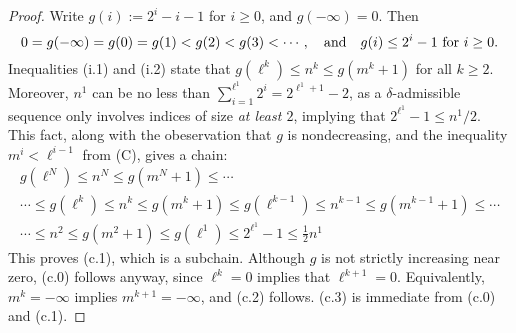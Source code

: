 \documentclass[10pt]{article}
\newcommand{\minDim}{m}
\begin{document}
\begin{KoszulSequenceCombinatorics}
\begin{proof}
Write $g(i):=2^i-i-1$ for $i\geq0$, and $g(-\infty)=0$. Then
\[0=g(-\infty)=g(0)=g(1)<g(2)<g(3)<\cdots,\quad \textup{and}\quad g(i)\leq 2^i-1 \textup{ for $i\geq0$}.\]
Inequalities \textup{(i.1)} and \textup{(i.2)} state that $g(\ell^k)\leq n^k\leq g(\minDim^k+1)$ for all $k\geq2$. %
Moreover, $n^1$ can be no less than $\sum_{i=1}^{\ell^1}2^i=2^{\ell^1+1}-2$, as a $\delta$-admissible sequence only involves indices of size \emph{at least $2$}, implying that $2^{\ell^1}-1\leq n^1/2$. This fact, along with the obeservation that $g$ is nondecreasing, and the inequality $m^i<\ell^{i-1}$ from \textup{(C)}, gives a chain:
\begin{multline*}
g(\ell^N)\leq n^N\leq g(\minDim^N+1)\leq\cdots\\\cdots \leq g(\ell^k)\leq n^k\leq g(\minDim^k+1)\leq g(\ell^{k-1})\leq n^{k-1}\leq g(\minDim^{k-1}+1)\leq\cdots\\
\cdots\leq n^2\leq g(\minDim^2+1)\leq g(\ell^{1})\leq 2^{\ell^1}-1\leq \tfrac{1}{2}n^1
\end{multline*}
This proves \textup{(c.1)}, which is a subchain. Although $g$ is not strictly increasing near zero, \textup{(c.0)} follows anyway, since $\ell^k=0$ implies that $\ell^{k+1}=0$. Equivalently, $m^k=-\infty$ implies $m^{k+1}=-\infty$, and \textup{(c.2)} follows. \textup{(c.3)} is immediate from \textup{(c.0)} and \textup{(c.1)}.


\end{proof}
\end{KoszulSequenceCombinatorics}
\end{document}
